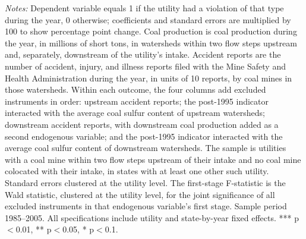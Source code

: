 \begin{table}[htbp]
\begin{minipage}{\linewidth}
\textit{Notes:} Dependent variable equals 1 if the utility had a violation of that type during the year, 0 otherwise; coefficients and standard errors are multiplied by 100 to show percentage point change. Coal production is coal production during the year, in millions of short tons, in watersheds within two flow steps upstream and, separately, downstream of the utility's intake. Accident reports are the number of accident, injury, and illness reports filed with the Mine Safety and Health Administration during the year, in units of 10 reports, by coal mines in those watersheds. Within each outcome, the four columns add excluded instruments in order: upstream accident reports; the post-1995 indicator interacted with the average coal sulfur content of upstream watersheds; downstream accident reports, with downstream coal production added as a second endogenous variable; and the post-1995 indicator interacted with the average coal sulfur content of downstream watersheds. The sample is utilities with a coal mine within two flow steps upstream of their intake and no coal mine colocated with their intake, in states with at least one other such utility. Standard errors clustered at the utility level. The first-stage F-statistic is the Wald statistic, clustered at the utility level, for the joint significance of all excluded instruments in that endogenous variable's first stage. Sample period 1985--2005. All specifications include utility and state-by-year fixed effects. *** p$<$0.01, ** p$<$0.05, * p$<$0.1.
\end{minipage}
\end{table}
